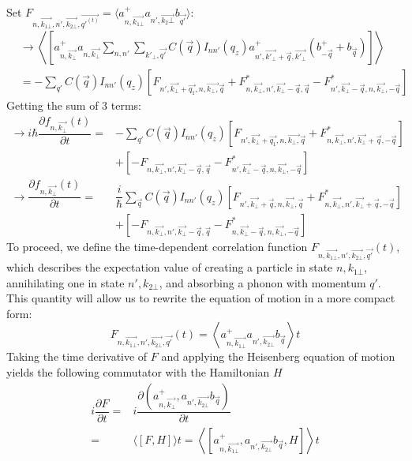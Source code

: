 \documentclass{article}
\begin{document}
Set $F_{n,\vec{k_{1\bot}},n', \vec{k_{2\bot}},\vec{q'^{(t)}}} = \langle a^+_{n, \vec{k_{1\bot}}}a_{n',\vec{k_2\bot}} b_{\vec{q'}}\rangle$:
\begin{align*}
    & \rightarrow \left\langle \left[a^+_{n, \vec{k_\bot}}a_{n,\vec{k_\bot}} \sum_{n,n'}\sum_{k'_\bot,\vec{q'}}C\left(\vec{q}\right)I_{nn'}\left(q_z\right)a^+_{n', \vec{k'_\bot}+\vec{q},\vec{k'_\bot}}\left(b^+_{-\vec{q}}+b_{\vec{q}}\right)\right]\right\rangle\\ 
    & = -\sum_{q'} C\left(\vec{q}\right)I_{nn'}\left(q_z\right) \left[F_{n',\vec{k_\bot}+\vec{q_1},n,\vec{k_\bot,}\vec{q}}+F^*_{n,\vec{k_\bot},n',\vec{k_\bot}-\vec{q},\vec{q}}-F^*_{n',\vec{k_\bot}-\vec{q},n,\vec{k_\bot},-\vec{q}}\right]
\end{align*}
Getting the sum of 3 terms:
\begin{align*}
    \rightarrow i\hbar\dfrac{\partial f_{n, \vec{k_\bot}}\left(t\right)}{\partial t} = & -\sum_{q'} C\left(\vec{q}\right)I_{nn'}\left(q_z\right) \left[F_{n',\vec{k_\bot}+\vec{q_1},n,\vec{k_\bot,}\vec{q}}+F^*_{n,\vec{k_\bot},n',\vec{k_\bot}+\vec{q},-\vec{q}}\right]\\
    & + \left[-F_{n,\vec{k_\bot},n',\vec{k_\bot}-\vec{q},\vec{q}}-F^*_{n',\vec{k_\bot}-\vec{q},n,\vec{k_\bot},-\vec{q}}\right]\\
    \rightarrow \dfrac{\partial f_{n, \vec{k_\bot}}(t)}{\partial t} = & \dfrac{i}{\hbar} \sum_{\vec{q}} C\left(\vec{q}\right) I_{nn'} \left(q_z \right) \left[ F_{n', \vec{k_\bot}+\vec{q},n,\vec{k_\bot},\vec{q}}+ F^*_{n,
    \vec{k_\bot},n',\vec{k_\bot}+\vec{q},-\vec{q}}\right] \\
    & + \left[-F_{n,\vec{k_\bot},n', \vec{k_\bot}-\vec{q}, \vec{q}}- F^*_{n, \vec{k_\bot}-\vec{q}, n, \vec{k_\bot},-\vec{q}}\right]
\end{align*}
To proceed, we define the time-dependent correlation function $F_{n, \vec{k_{1\bot}}, n',\vec{k_{2\bot}},\vec{q'}}(t)$, which describes the expectation value of creating a particle in state $n,k_{1\bot}$, annihilating one in state $n', k_{2\bot}$, and absorbing a phonon with momentum $q'$. This quantity will allow us to rewrite the equation of motion in a more compact form:  $$F_{n, \vec{k_{1\bot}}, n',\vec{k_{2\bot}},\vec{q'}}(t)= \left\langle a^+_{n,\vec{k_{1\bot}}}a_{n', \vec{k_{2\bot}}}b_{\vec{q}} \right \rangle t$$ 
Taking the time derivative of $F$ and applying the Heisenberg equation of motion yields the following commutator with the Hamiltonian $H$
\begin{align*}
    i \dfrac{\partial F}{\partial t} = &i \dfrac{\partial \left(a^+_{n, \vec{k_\bot}}, a_{n', \vec{k_{2\bot}}}b_{\vec{q}}\right)}{\partial t}\\
    = & \langle [F,H] \rangle t= \left\langle\left[a^+_{n,\vec{k_{1\bot}}},a_{n', \vec{k_{2\bot}}}b_{\vec{q}},H\right] \right\rangle t
\end{align*}
\end{document}
